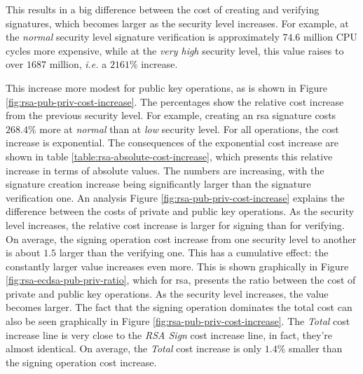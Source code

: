 \documentclass{llncs}
\begin{document}
This results in a big difference between the cost of creating and verifying signatures, which becomes larger as the security level increases.
For example, at the \textit{normal} security level signature verification is approximately $74.6$ million CPU cycles more expensive,
while at the \textit{very high} security level, this value raises to over $1687$ million, \textit{i.e.} a $2161\%$ increase.

This increase more modest for public key operations, as is shown in Figure \ref{fig:rsa-pub-priv-cost-increase}.
The percentages show the relative cost increase from the previous security level. For example, creating an \gls{rsa} signature costs
$268.4\%$ more at \textit{normal} than at \textit{low} security level. For all operations, the cost increase is exponential.
The consequences of the exponential cost increase are shown in table \ref{table:rsa-absolute-cost-increase}, which presents this relative increase
in terms of absolute values. The numbers are increasing, with the signature creation increase being significantly larger
than the signature verification one. An analysis Figure \ref{fig:rsa-pub-priv-cost-increase}
explains the difference between the costs of private and public key operations. As the security level increases, the relative cost
increase is larger for signing than for verifying. On average, the signing operation cost increase from one security level to another
is about $1.5$ larger than the verifying one. This has a cumulative effect: the constantly larger value increases even more.
This is shown graphically in Figure \ref{fig:rsa-ecdsa-pub-priv-ratio}, which for \gls{rsa}, presents the ratio between the cost of private and
public key operations. As the security level increases, the value becomes larger. The fact that the signing operation dominates the total cost
can also be seen graphically in Figure \ref{fig:rsa-pub-priv-cost-increase}. The \textit{Total} cost increase line is very close to the
\textit{RSA Sign} cost increase line, in fact, they're almost identical. On average, the \textit{Total} cost increase is only $1.4\%$ smaller
than the signing operation cost increase.
\end{document}
